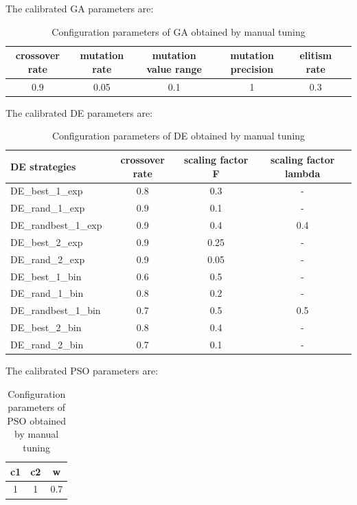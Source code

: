 \documentclass[12pt]{article}
\begin{document}
The calibrated GA parameters are:
\begin{table}[H]    
\centering
\footnotesize
\begin{tabular}{cccccc}

\hline
crossover rate&    mutation rate&    mutation value range&     mutation precision&     elitism rate\\
\hline

0.9&    0.05&    0.1&    1&    0.3&\\

\hline 
\end{tabular} 

\caption{Configuration parameters of GA obtained by manual tuning} 
\end{table}



The calibrated DE parameters are:

\begin{table}[H]    
\centering
\small 
\begin{tabular}{lccc}

\hline
DE strategies & crossover rate& scaling factor F& scaling factor lambda\\
\hline 
DE\_best\_1\_exp & 0.8 &    0.3&    - \\
DE\_rand\_1\_exp& 0.9&    0.1&    - \\
DE\_randbest\_1\_exp& 0.9&    0.4&    0.4 \\
DE\_best\_2\_exp& 0.9&    0.25&    - \\
DE\_rand\_2\_exp& 0.9&    0.05&    - \\
DE\_best\_1\_bin& 0.6&    0.5&    - \\
DE\_rand\_1\_bin& 0.8&    0.2&    - \\
DE\_randbest\_1\_bin& 0.7&    0.5&    0.5\\
DE\_best\_2\_bin& 0.8&    0.4&    - \\
DE\_rand\_2\_bin& 0.7&    0.1&    - \\
\hline 
\end{tabular} 
\caption{Configuration parameters of DE obtained by manual tuning} 
\end{table}

The calibrated PSO parameters are:
\begin{table}[H]    
\centering
\footnotesize
\begin{tabular}{ccc}

\hline
c1&    c2&    w \\
\hline

1&    1&    0.7\\

\hline 
\end{tabular} 

\caption{Configuration parameters of PSO obtained by manual tuning} 
\end{table}
\end{document}
